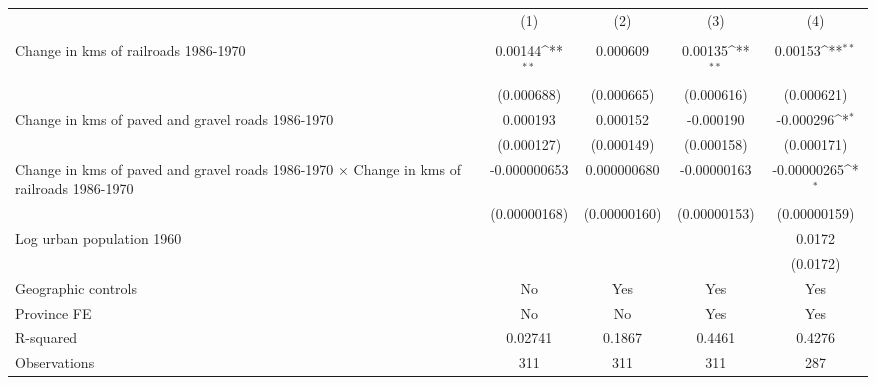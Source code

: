 {
\def\sym#1{\ifmmode^{#1}\else\(^{#1}\)\fi}
\begin{tabular}{l*{4}{c}}
\hline\hline
                &\multicolumn{1}{c}{(1)}&\multicolumn{1}{c}{(2)}&\multicolumn{1}{c}{(3)}&\multicolumn{1}{c}{(4)}\\
                &\multicolumn{1}{c}{}&\multicolumn{1}{c}{}&\multicolumn{1}{c}{}&\multicolumn{1}{c}{}\\
\hline
Change in kms of railroads 1986-1970&  0.00144\sym{**} & 0.000609         &  0.00135\sym{**} &  0.00153\sym{**} \\
                &(0.000688)         &(0.000665)         &(0.000616)         &(0.000621)         \\
[1em]
Change in kms of paved and gravel roads 1986-1970& 0.000193         & 0.000152         &-0.000190         &-0.000296\sym{*}  \\
                &(0.000127)         &(0.000149)         &(0.000158)         &(0.000171)         \\
[1em]
Change in kms of paved and gravel roads 1986-1970 $\times$ Change in kms of railroads 1986-1970&-0.000000653         &0.000000680         &-0.00000163         &-0.00000265\sym{*}  \\
                &(0.00000168)         &(0.00000160)         &(0.00000153)         &(0.00000159)         \\
[1em]
Log urban population 1960&                  &                  &                  &   0.0172         \\
                &                  &                  &                  & (0.0172)         \\
\hline
Geographic controls&       No         &      Yes         &      Yes         &      Yes         \\
Province FE     &       No         &       No         &      Yes         &      Yes         \\
R-squared       &  0.02741         &   0.1867         &   0.4461         &   0.4276         \\
Observations    &      311         &      311         &      311         &      287         \\
\hline\hline
\end{tabular}
}
